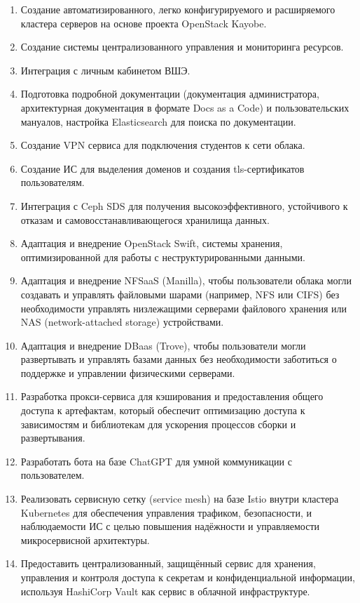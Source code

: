 \documentclass[14pt, a4paper]{extarticle}
\begin{document}
\begin{enumerate}
\item Создание автоматизированного, легко конфигурируемого и расширяемого кластера серверов на основе проекта OpenStack Kayobe.
\item Создание системы централизованного управления и мониторинга ресурсов.
\item Интеграция с личным кабинетом ВШЭ.
\item Подготовка подробной документации (документация администратора, архитектурная документация в формате Docs as a Code) и пользовательских мануалов, настройка Elasticsearch для поиска по документации.
\item Создание VPN сервиса для подключения студентов к сети облака.
\item Создание ИС для выделения доменов и создания tls-сертификатов пользователям.
\item Интеграция с Ceph SDS для получения высокоэффективного, устойчивого к отказам и самовосстанавливающегося хранилища данных.
\item Адаптация и внедрение OpenStack Swift, системы хранения, оптимизированной для работы с неструктурированными данными.
\item Адаптация и внедрение NFSaaS (Manilla), чтобы пользователи облака могли создавать и управлять файловыми шарами (например, NFS или CIFS) без необходимости управлять низлежащими серверами файлового хранения или NAS (network-attached storage) устройствами.
\item Адаптация и внедрение DBaas (Trove), чтобы пользователи могли развертывать и управлять базами данных без необходимости заботиться о поддержке и управлении физическими серверами.
\item Разработка прокси-сервиса для кэширования и предоставления общего доступа к артефактам, который обеспечит оптимизацию доступа к зависимостям и библиотекам для ускорения процессов сборки и развертывания.
\item Разработать бота на базе ChatGPT для умной коммуникации с пользователем.
\item Реализовать сервисную сетку (service mesh) на базе Istio внутри кластера Kubernetes для обеспечения управления трафиком, безопасности, и наблюдаемости ИС с целью повышения надёжности и управляемости микросервисной архитектуры.
\item Предоставить централизованный, защищённый сервис для хранения, управления и контроля доступа к секретам и конфиденциальной информации, используя HashiCorp Vault как сервис в облачной инфраструктуре.

\end{enumerate}
\end{document}
